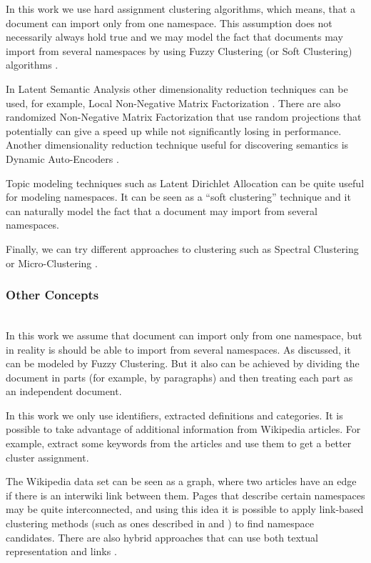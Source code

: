 In this work we use hard assignment clustering algorithms, which means, that a document 
can import only from one namespace. This assumption does not necessarily always hold true 
and we may model the fact that documents may import from several namespaces by 
using Fuzzy Clustering (or Soft Clustering) algorithms \cite{baraldi1999survey}.

In Latent Semantic Analysis other dimensionality reduction techniques
can be used, for example, Local Non-Negative Matrix Factorization \cite{li2001learning}.
There are also randomized Non-Negative Matrix Factorization that use
random projections \cite{wang2010efficient} \cite{damle2014random}
that potentially can give a speed up while not significantly losing
in performance. Another dimensionality reduction technique useful for
discovering semantics is Dynamic Auto-Encoders \cite{mirowski2010dynamic}.

Topic modeling techniques such as Latent Dirichlet Allocation
\cite{blei2003latent} can be quite useful for modeling namespaces. It can be 
seen as a ``soft clustering'' technique and it can naturally model the fact that 
a document may import from several namespaces.

Finally, we can try different approaches to clustering such as 
Spectral Clustering \cite{ng2002spectral} or Micro-Clustering \cite{uno2015micro}.


\subsubsection{Other Concepts}  \ \\

In this work we assume that document can import only from one namespace,
but in reality is should be able to import from several namespaces. As discussed,
it can be modeled by Fuzzy Clustering. But it also can be achieved by 
dividing the document in parts (for example, by paragraphs)
and then treating each part as an independent document.

In this work we only use identifiers, extracted definitions and categories.
It is possible to take advantage of additional information from Wikipedia
articles. For example, extract some keywords from the articles
and use them to get a better cluster assignment.

The Wikipedia data set can be seen as a graph, where two articles have 
an edge if there is an interwiki link between them. Pages that describe 
certain namespaces may be quite interconnected, and using this idea 
it is possible to apply link-based clustering methods (such as ones 
described in \cite{botafogo1991identifying} and \cite{johnson1996adaptive}) to 
find namespace candidates. There are also hybrid approaches that
can use both textual representation and links \cite{oikonomakou2005review}.

